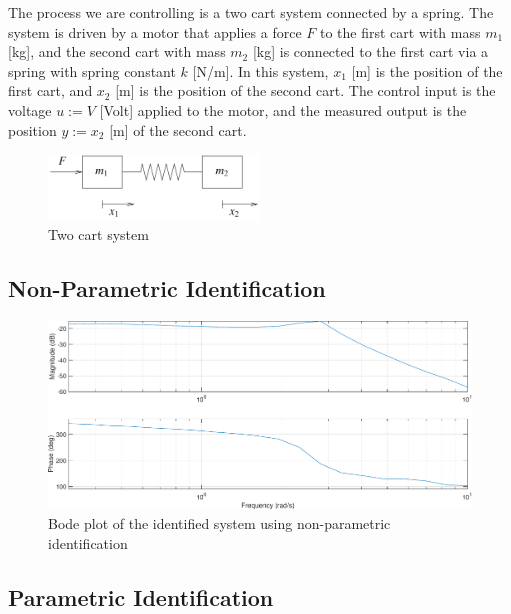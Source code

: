 \documentclass[11pt]{article}
\begin{document}
The process we are controlling is a two cart system
connected by a spring. The system is driven by a motor that
applies a force $F$ to the first cart with mass $m_1$ [kg], and the second cart
with mass $m_2$ [kg] is connected to the first cart via a spring with spring constant $k$ [N/m].
In this system, $x_1$ [m] is the position of the first cart, and $x_2$ [m] is the position of the second cart.
The control input is the voltage $u := V$ [Volt] applied to the motor, and the measured output
is the position $y := x_2$ [m] of the second cart.
\begin{figure}[!ht]
\centering
\includegraphics[width=0.5\textwidth]{two-cart-system.png}
\caption{Two cart system}
\label{fig:two-cart-system}
\end{figure}

\subsection{Non-Parametric Identification}

\begin{figure}[!ht]
\centering
\includegraphics[width=\textwidth]{bodeid-corr.pdf}
\caption{Bode plot of the identified system using non-parametric identification}
\label{fig:bodeid_corr}
\end{figure}


\subsection{Parametric Identification}
\end{document}
